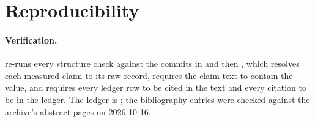 
\section{Reproducibility}\label{sec:repro}

\paragraph{Verification.}  re-runs
every structure check against the commits in  and then
, which resolves each measured claim to its raw record,
requires the claim text to contain the value, and requires every ledger row to be cited in the
text and every citation to be in the ledger. The ledger is ; the
bibliography entries were checked against the archive's abstract pages on 2026-10-16.

